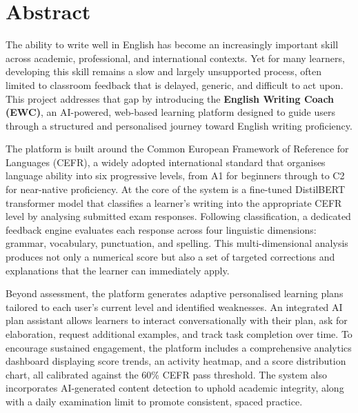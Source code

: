 \documentclass[12pt, a4paper]{report}
\begin{document}
\setcounter{page}{1}

\chapter*{Abstract}

The ability to write well in English has become an increasingly important skill across academic, professional, and international contexts. Yet for many learners, developing this skill remains a slow and largely unsupported process, often limited to classroom feedback that is delayed, generic, and difficult to act upon. This project addresses that gap by introducing the \textbf{English Writing Coach (EWC)}, an AI-powered, web-based learning platform designed to guide users through a structured and personalised journey toward English writing proficiency.

The platform is built around the Common European Framework of Reference for Languages (CEFR), a widely adopted international standard that organises language ability into six progressive levels, from A1 for beginners through to C2 for near-native proficiency. At the core of the system is a fine-tuned DistilBERT transformer model that classifies a learner's writing into the appropriate CEFR level by analysing submitted exam responses. Following classification, a dedicated feedback engine evaluates each response across four linguistic dimensions: grammar, vocabulary, punctuation, and spelling. This multi-dimensional analysis produces not only a numerical score but also a set of targeted corrections and explanations that the learner can immediately apply.

Beyond assessment, the platform generates adaptive personalised learning plans tailored to each user's current level and identified weaknesses. An integrated AI plan assistant allows learners to interact conversationally with their plan, ask for elaboration, request additional examples, and track task completion over time. To encourage sustained engagement, the platform includes a comprehensive analytics dashboard displaying score trends, an activity heatmap, and a score distribution chart, all calibrated against the 60\% CEFR pass threshold. The system also incorporates AI-generated content detection to uphold academic integrity, along with a daily examination limit to promote consistent, spaced practice.
\end{document}

